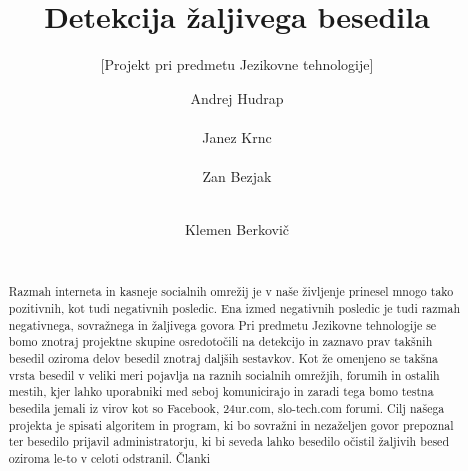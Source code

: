 \documentclass{acm_proc_article-sp}
\begin{document}
\title{Detekcija žaljivega besedila}
\subtitle{[Projekt pri predmetu Jezikovne tehnologije]}


\author{
\alignauthor Andrej Hudrap\\
       \\
\alignauthor Janez Krnc\\
       \\
\alignauthor Zan Bezjak\\
       \\
\and
\alignauthor Klemen Berkovič\\
       \\
}
\maketitle

\begin{abstract}
Razmah interneta in kasneje socialnih omrežij je v naše življenje prinesel mnogo tako pozitivnih, kot tudi negativnih posledic.
Ena izmed negativnih posledic je tudi razmah negativnega, sovražnega in žaljivega govora
Pri predmetu Jezikovne tehnologije se bomo znotraj projektne skupine osredotočili na detekcijo in zaznavo prav takšnih besedil oziroma delov besedil znotraj daljših sestavkov.
Kot že omenjeno se takšna vrsta besedil v veliki meri pojavlja na raznih socialnih omrežjih, forumih in ostalih mestih, kjer lahko uporabniki med seboj komunicirajo in zaradi tega bomo testna besedila jemali iz virov kot so Facebook, 24ur.com, slo-tech.com forumi.
Cilj našega projekta je spisati algoritem in program, ki bo sovražni in nezaželjen govor prepoznal ter besedilo prijavil administratorju, ki bi seveda lahko besedilo očistil žaljivih besed oziroma le-to v celoti odstranil.
Članki~\cite{Burnap2016, Chen:2012:DOL:2411131.2411739, POI3:POI385}
\end{abstract}



 
\end{document}

